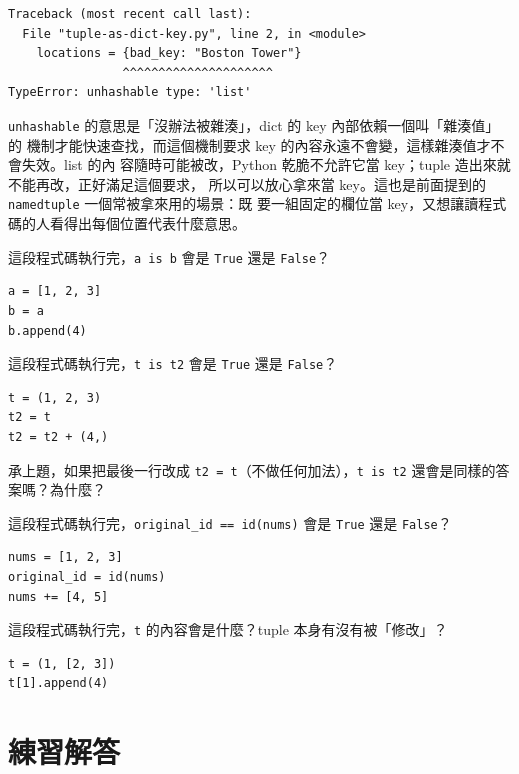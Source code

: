 \begin{verbatim}
Traceback (most recent call last):
  File "tuple-as-dict-key.py", line 2, in <module>
    locations = {bad_key: "Boston Tower"}
                ^^^^^^^^^^^^^^^^^^^^^
TypeError: unhashable type: 'list'
\end{verbatim}

\texttt{unhashable} 的意思是「沒辦法被雜湊」，dict 的 key 內部依賴一個叫「雜湊值」的
機制才能快速查找，而這個機制要求 key 的內容永遠不會變，這樣雜湊值才不會失效。list 的內
容隨時可能被改，Python 乾脆不允許它當 key；tuple 造出來就不能再改，正好滿足這個要求，
所以可以放心拿來當 key。這也是前面提到的 \texttt{namedtuple} 一個常被拿來用的場景：既
要一組固定的欄位當 key，又想讓讀程式碼的人看得出每個位置代表什麼意思。

\begin{drills}[label=drills:tuple-vs-list]
\item 這段程式碼執行完，\texttt{a is b} 會是 \texttt{True} 還是 \texttt{False}？
\begin{verbatim}
a = [1, 2, 3]
b = a
b.append(4)
\end{verbatim}
\item 這段程式碼執行完，\texttt{t is t2} 會是 \texttt{True} 還是 \texttt{False}？
\begin{verbatim}
t = (1, 2, 3)
t2 = t
t2 = t2 + (4,)
\end{verbatim}
\item 承上題，如果把最後一行改成 \texttt{t2 = t}（不做任何加法），\texttt{t is t2}
還會是同樣的答案嗎？為什麼？
\item 這段程式碼執行完，\texttt{original\_id == id(nums)} 會是 \texttt{True} 還是
\texttt{False}？
\begin{verbatim}
nums = [1, 2, 3]
original_id = id(nums)
nums += [4, 5]
\end{verbatim}
\item 這段程式碼執行完，\texttt{t} 的內容會是什麼？tuple 本身有沒有被「修改」？
\begin{verbatim}
t = (1, [2, 3])
t[1].append(4)
\end{verbatim}
\end{drills}

\section*{練習解答}


